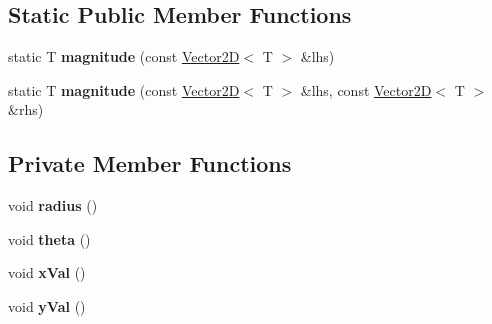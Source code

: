 \subsection*{Static Public Member Functions}
\begin{DoxyCompactItemize}
\item 
\mbox{\label{class_vector2_d_a8e8ba14195521bf6f0be330118cbd23b}} 
static T {\bfseries magnitude} (const \hyperlink{class_vector2_d}{Vector2D}$<$ T $>$ \&lhs)
\item 
\mbox{\label{class_vector2_d_af4af950a69d3e9bab0ace6195a3563da}} 
static T {\bfseries magnitude} (const \hyperlink{class_vector2_d}{Vector2D}$<$ T $>$ \&lhs, const \hyperlink{class_vector2_d}{Vector2D}$<$ T $>$ \&rhs)
\end{DoxyCompactItemize}
\subsection*{Private Member Functions}
\begin{DoxyCompactItemize}
\item 
\mbox{\label{class_vector2_d_a7f687846d5a25c2c23488ddf6cb0f407}} 
void {\bfseries radius} ()
\item 
\mbox{\label{class_vector2_d_a4d566aae857d04bedbc1cc078a84cf85}} 
void {\bfseries theta} ()
\item 
\mbox{\label{class_vector2_d_a5d93604e93eb2fc712a77b49f618020b}} 
void {\bfseries x\+Val} ()
\item 
\mbox{\label{class_vector2_d_a37ea419cf9315b798a2a78498591a66c}} 
void {\bfseries y\+Val} ()
\end{DoxyCompactItemize}
